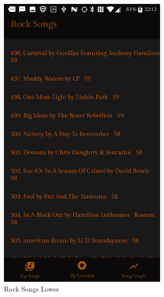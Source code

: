\documentclass{article}
\begin{document}
\begin{figure}[H]
\begin{minipage}{.5\textwidth}
    \includegraphics[width=0.75\textwidth]{RockList.png}
    \caption{Rock Songs Lower}
    \label{fig:ER}
  \end{minipage}
\end{figure}
\end{document}
